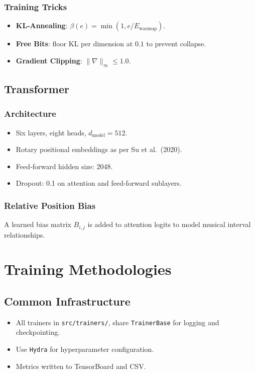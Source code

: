 \subsubsection{Training Tricks}
\begin{itemize}
  \item \textbf{KL‐Annealing}: $\beta(e)=\min(1, e/E_{\mathrm{warmup}})$.
  \item \textbf{Free Bits}: floor KL per dimension at $0.1$ to prevent collapse.
  \item \textbf{Gradient Clipping}: $\lVert \nabla \rVert_\infty \le 1.0$.
\end{itemize}

\subsection{Transformer}
\subsubsection{Architecture}
\begin{itemize}
  \item Six layers, eight heads, $d_{\mathrm{model}}=512$.
  \item Rotary positional embeddings as per Su et al.\ (2020).
  \item Feed‐forward hidden size: 2048.
  \item Dropout: 0.1 on attention and feed‐forward sublayers.
\end{itemize}

\subsubsection{Relative Position Bias}
A learned bias matrix $B_{i,j}$ is added to attention logits to model musical interval relationships.

\newpage
\section{Training Methodologies}

\subsection{Common Infrastructure}
\begin{itemize}
  \item All trainers in \texttt{src/trainers/}, share \texttt{TrainerBase} for logging and checkpointing.
  \item Use \texttt{Hydra} for hyperparameter configuration.
  \item Metrics written to TensorBoard and CSV.
\end{itemize}

